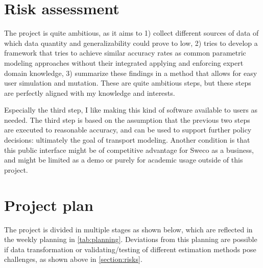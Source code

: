 \documentclass[sigconf, natbib=false, nonacm]{acmart}
\begin{document}
\section{Risk assessment}
    \label{section:risks}
    The project is quite ambitious, as it aims to 1) collect different sources of data of which data quantity and generalizability could prove to low, 2) tries to develop a framework that tries to achieve similar accuracy rates as common parametric modeling approaches without their integrated applying and enforcing expert domain knowledge, 3) summarize these findings in a method that allows for easy user simulation and mutation. These are quite ambitious steps, but these steps are perfectly aligned with my knowledge and interests. 
    
    Especially the third step, I like making this kind of software available to users as needed. The third step is based on the assumption that the previous two steps are executed to reasonable accuracy, and can be used to support further policy decisions: ultimately the goal of transport modeling. Another condition is that this public interface might be of competitive advantage for Sweco as a business, and might be limited as a demo or purely for academic usage outside of this project. 
	
\section{Project plan}
    \label{section:planning}
    The project is divided in multiple stages as shown below, which are reflected in the weekly planning in \autoref{tab:planning}. Deviations from this planning are possible if data transformation or validating/testing of different estimation methods pose challenges, as shown above in \autoref{section:risks}.
    
\end{document}
